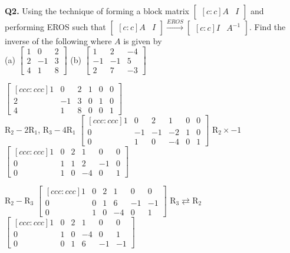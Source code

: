 \documentclass[addpoints]{exam}
\begin{document}
\begin{sloppypar}
\begin{questions}
    \question
    \textbf{Q2. } Using the technique of forming a block matrix $\begin{bmatrix}[c:c]
        A & I
    \end{bmatrix}$ and performing EROS such that $ \begin{bmatrix}[c:c]
        A & I
    \end{bmatrix} \xrightarrow{EROS} \begin{bmatrix}[c:c]
        I & A^{-1}
    \end{bmatrix}$. Find the inverse of the following where $A$ is given by \\ (a) $ \begin{bmatrix}
        1 & 0 & 2 \\ 2 & -1 & 3 \\ 4 & 1 & 8
    \end{bmatrix} $ (b) $ \begin{bmatrix}
        1 & 2 & -4 \\ -1 & -1 & 5 \\ 2 & 7 & -3
    \end{bmatrix} $
    \begin{solution}
        $ \begin{bmatrix}[ccc : ccc]
            1 & 0 & 2 & 1 & 0 & 0 \\ 
            2 & -1 & 3 & 0 & 1 & 0 \\ 
            4 & 1 & 8 & 0 & 0 & 1
        \end{bmatrix} $ \\ 
        R$_2 - 2$R$_1$, R$_3 - 4$R$_1$ $ \begin{bmatrix}[ccc:ccc]
            1 & 0 & 2 & 1 & 0 & 0 \\ 
            0 & -1 & -1 & -2 & 1 & 0 \\ 
            0 & 1 & 0 & -4 & 0 & 1 
        \end{bmatrix} $ \hspace*{5mm} R$_2 \times -1$ $ \begin{bmatrix}[ccc:ccc]
            1 & 0 & 2 & 1 & 0 & 0 \\ 
            0 & 1 & 1 & 2 & -1 & 0 \\ 0 & 1 & 0 & -4 & 0 & 1
        \end{bmatrix} $

        R$_2 - $R$_3$ $ \begin{bmatrix}[ccc:ccc]
            1 & 0 & 2 & 1 & 0 & 0 \\ 0 & 0 & 1 & 6 & -1 & -1 \\ 0 & 1 & 0 & -4 & 0 & 1             
        \end{bmatrix} $ \hspace*{5mm} R$_3 \rightleftarrows  $R$_2$ $ \begin{bmatrix}[ccc:ccc]
            1 & 0 & 2 & 1 & 0 & 0 \\ 0 & 1 & 0 & -4 & 0 & 1 \\ 0 & 0 & 1 & 6 & -1 & -1            
        \end{bmatrix} $ 


\end{solution}
\end{questions}
\end{sloppypar}
\end{document}
